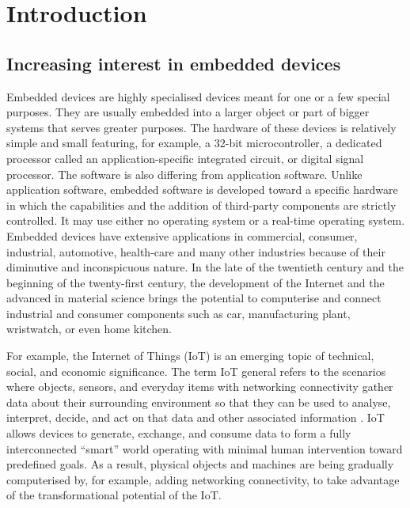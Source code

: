 
\section{Introduction}


\subsection{Increasing interest in embedded devices}
\justify
Embedded devices are highly specialised devices meant for one or a 
few special purposes. They are usually embedded into a larger object 
or part of bigger systems that serves greater purposes. The hardware 
of these devices is relatively simple and small featuring, for example, 
a 32-bit microcontroller, a dedicated processor called an application-specific 
integrated circuit, or digital signal processor. The software is also 
differing from application software. Unlike application software, embedded 
software is developed toward a specific hardware in which the capabilities 
and the addition of third-party components are strictly controlled. It may 
use either no operating system or a real-time operating system. Embedded 
devices have extensive applications in commercial, consumer, industrial, 
automotive, health-care and many other industries because of their diminutive 
and inconspicuous nature. In the late of the twentieth century and the 
beginning of the twenty-first century, the development of the Internet 
and the advanced in material science brings the potential to computerise 
and connect industrial and consumer components such as car, manufacturing 
plant, wristwatch, or even home kitchen. 

\justify
For example, the Internet of Things (IoT) is an emerging topic of technical, 
social, and economic significance. The term IoT general refers to the 
scenarios where objects, sensors, and everyday items with networking 
connectivity gather data about their surrounding environment so that they 
can be used to analyse, interpret, decide, and act on that data and other 
associated information \cite{KSL15}. IoT allows devices to generate, exchange, 
and consume data to form a fully interconnected “smart” world operating with 
minimal human intervention toward predefined goals. As a result, physical objects 
and machines are being gradually computerised by, for example, adding 
networking connectivity, to take advantage of the transformational 
potential of the IoT. 

